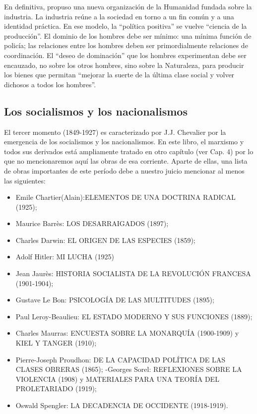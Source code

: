 \documentclass[
]{book}
\providecommand{\tightlist}{%
  \setlength{\itemsep}{0pt}\setlength{\parskip}{0pt}}
\begin{document}
En definitiva, propuso una nueva organización de la Humanidad fundada sobre la industria. La industria reúne a la sociedad en torno a un fin común y a una identidad práctica. En ese modelo, la ``política positiva'' se vuelve ``ciencia de la producción''. El dominio de los hombres debe ser mínimo: una mínima función de policía; las relaciones entre los hombres deben ser primordialmente relaciones de coordinación. El ``deseo de dominación'' que los hombres experimentan debe ser encauzado, no sobre los otros hombres, sino sobre la Naturaleza, para producir los bienes que permitan ``mejorar la suerte de la última clase social y volver dichosos a todos los hombres''.

\hypertarget{los-socialismos-y-los-nacionalismos}{%
\subsection*{Los socialismos y los nacionalismos}\label{los-socialismos-y-los-nacionalismos}}

El tercer momento (1849-1927) es caracterizado por J.J. Chevalier por la emergencia de los socialismos y los nacionalismos. En este libro, el marxismo y todos sus derivados está ampliamente tratado en otro capítulo (ver Cap. 4) por lo que no mencionaremos aquí las obras de esa corriente. Aparte de ellas, una lista de obras importantes de este período debe a nuestro juicio mencionar al menos las siguientes:

\begin{itemize}
\tightlist
\item
  Emile Chartier(Alain):ELEMENTOS DE UNA DOCTRINA RADICAL (1925);
\item
  Maurice Barrès: LOS DESARRAIGADOS (1897);
\item
  Charles Darwin: EL ORIGEN DE LAS ESPECIES (1859);
\item
  Adolf Hitler: MI LUCHA (1925)
\item
  Jean Jaurès: HISTORIA SOCIALISTA DE LA REVOLUCIÓN FRANCESA (1901-1904);
\item
  Gustave Le Bon: PSICOLOGÍA DE LAS MULTITUDES (1895);
\item
  Paul Leroy-Beaulieu: EL ESTADO MODERNO Y SUS FUNCIONES (1889);
\item
  Charles Maurras: ENCUESTA SOBRE LA MONARQUÍA (1900-1909) y KIEL Y TANGER (1910);
\item
  Pierre-Joseph Proudhon: DE LA CAPACIDAD POLÍTICA DE LAS CLASES OBRERAS (1865);
  -Georges Sorel: REFLEXIONES SOBRE LA VIOLENCIA (1908) y MATERIALES PARA UNA TEORÍA DEL PROLETARIADO (1919);
\item
  Oswald Spengler: LA DECADENCIA DE OCCIDENTE (1918-1919).
\end{itemize}
\end{document}
